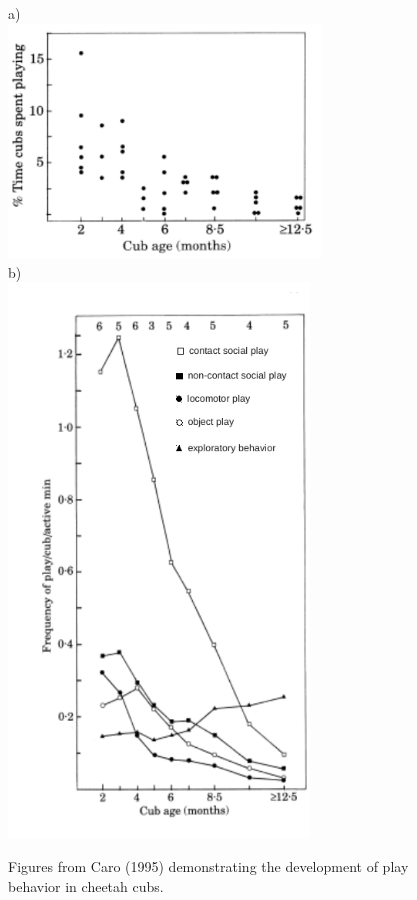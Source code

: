\begin{figure}
\caption{Figures from Caro (1995) demonstrating the development of play behavior in cheetah cubs.}
  \begin{center}
    \begin{minipage}[t]{0.48\linewidth}
      a)\\
      \includegraphics[width=83mm]{caroFig1edit.png}\\
      b)\\
      \includegraphics[width=80mm]{caroFig2edit.pdf}
    \end{minipage}\hfill
    \begin{minipage}[t]{0.48\linewidth}

\end{minipage}
\end{center}
\end{figure}

